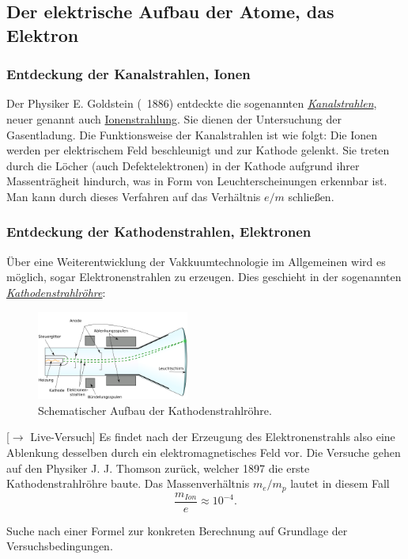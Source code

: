 \documentclass[]{subfiles}
\begin{document}
    \subsection{Der elektrische Aufbau der Atome, das Elektron}
        \subsubsection*{Entdeckung der Kanalstrahlen, Ionen}
            Der Physiker E. Goldstein (~1886) entdeckte die sogenannten \href{https://de.wikipedia.org/wiki/Kanalstrahlen}{\emph{Kanalstrahlen}}, neuer genannt auch \href{https://de.wikipedia.org/w/index.php?title=Ionenstrahlung&redirect=no}{Ionenstrahlung}. Sie dienen der Untersuchung der Gasentladung. Die Funktionsweise der Kanalstrahlen ist wie folgt:
            Die Ionen werden per elektrischem Feld beschleunigt und zur Kathode gelenkt. Sie treten durch die Löcher (auch Defektelektronen) in der Kathode aufgrund ihrer Massenträgheit hindurch, was in Form von Leuchterscheinungen erkennbar ist. 
            Man kann durch dieses Verfahren auf das Verhältnis $e/m$ schließen. 

        \subsubsection*{Entdeckung der Kathodenstrahlen, Elektronen}
            Über eine Weiterentwicklung der Vakkuumtechnologie im Allgemeinen wird es möglich, sogar Elektronenstrahlen zu erzeugen. Dies geschieht in der sogenannten \href{https://de.wikipedia.org/wiki/Kathodenstrahlröhre}{\textit{Kathodenstrahlröhre}}:
            \begin{figure}[H]
                \centering
                \includegraphics[width=5cm]{Bilddateien/Kathodenstrahlroehre.png}
                \caption{Schematischer Aufbau der Kathodenstrahlröhre.}
            \end{figure}
            [$\to$ Live-Versuch] Es findet nach der Erzeugung des Elektronenstrahls also eine Ablenkung desselben durch ein elektromagnetisches Feld vor. Die Versuche gehen auf den Physiker J. J. Thomson zurück, welcher 1897 die erste Kathodenstrahlröhre baute. 
            Das Massenverhältnis $m_e/m_p$ lautet in diesem Fall 
            \[\frac{m_{Ion}}{e}\approx 10^{-4}.\]
            \begin{Aufgabe}
                \nr{} Suche nach einer Formel zur konkreten Berechnung auf Grundlage der Versuchsbedingungen.
            \end{Aufgabe}
            
\end{document}
